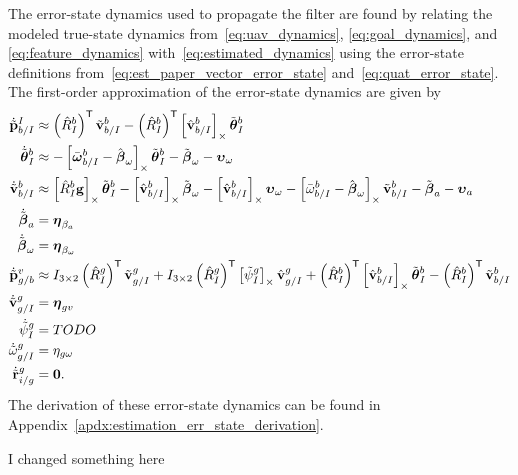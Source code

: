 The error-state dynamics used to propagate the filter are found by relating
the modeled true-state dynamics from~\eqref{eq:uav_dynamics},
\eqref{eq:goal_dynamics}, and \eqref{eq:feature_dynamics}
with~\eqref{eq:estimated_dynamics} using the error-state definitions
from~\eqref{eq:est_paper_vector_error_state} and~\eqref{eq:quat_error_state}. The
first-order approximation of the error-state dynamics are given by 
\begin{align}
  \dot{\tilde{\boldsymbol{\mathrm{p}}}}_{b/I}^I
  &\approx
  \left( \hat{R}_I^b \right)^{\mathsf{T}} \tilde{\boldsymbol{\mathrm{v}}}_{b/I}^b
  - \left( \hat{R}_I^b \right)^{\mathsf{T}} \left[ \hat{\boldsymbol{\mathrm{v}}}_{b/I}^b \right]_{\times}
  \tilde{\boldsymbol{\mathrm{\theta}}}_I^b
  \\
  \dot{\tilde{\boldsymbol{\mathrm{\theta}}}}_{I}^{b} 
  &\approx 	
  -\left[  \bar{\boldsymbol{\mathrm{\omega}}}_{b/I}^b - \hat{\boldsymbol{\mathrm{\beta}}}_\omega \right]_{\times}
    \tilde{\boldsymbol{\mathrm{\theta}}}_I^b
    - \tilde{\boldsymbol{\mathrm{\beta}}}_\omega -
    \boldsymbol{\mathrm{\upsilon}}_\omega
  \nonumber \\
  \dot{\tilde{\boldsymbol{\mathrm{v}}}}_{b/I}^b 
  &\approx
  \left[  \hat{R}_I^b \boldsymbol{\mathrm{g}}  \right]_{\times} \tilde{\boldsymbol{\mathrm{\theta}}}_I^b 
  -
  \left[  \hat{\boldsymbol{\mathrm{v}}}_{b/I}^b  \right]_{\times} \tilde{\boldsymbol{\mathrm{\beta}}}_\omega
  -
  \left[  \hat{\boldsymbol{\mathrm{v}}}_{b/I}^b  \right]_{\times} \boldsymbol{\mathrm{\upsilon}}_\omega
  -
  \left[  \bar{\omega}_{b/I}^b - \hat{\boldsymbol{\mathrm{\beta}}}_\omega  \right]_{\times}
  \tilde{\boldsymbol{\mathrm{v}}}_{b/I}^b
  -
  \tilde{\boldsymbol{\mathrm{\beta}}}_a
  -
  \boldsymbol{\mathrm{\upsilon}}_a \nonumber
  \\
  \dot{\tilde{\boldsymbol{\mathrm{\beta}}}}_a &= \boldsymbol{\mathrm{\eta}}_{\beta_a} \nonumber
  \\
  \dot{\tilde{\boldsymbol{\mathrm{\beta}}}}_\omega &= \boldsymbol{\mathrm{\eta}}_{\beta_\omega} \nonumber
  \\
  \dot{\tilde{\boldsymbol{\mathrm{p}}}}_{g/b}^{v}
                                  &\approx
  I_{3 \times 2} \left( \hat{R}_{I}^{g} \right)^{\mathsf{T}}
  \tilde{\boldsymbol{\mathrm{v}}}_{g/I}^g
  +
  I_{3 \times 2} \left( \hat{R}_{I}^{g} \right)^{\mathsf{T}}
  \left[  \tilde{\psi}_I^g  \right]_{\times} \hat{\boldsymbol{\mathrm{v}}}_{g/I}^g
  +
  \left( \hat{R}_{I}^{b} \right)^{\mathsf{T}} \left[  \hat{\boldsymbol{\mathrm{v}}}_{b/I}^{b}  \right]_{\times} 
  \tilde{\boldsymbol{\mathrm{\theta}}}_I^b
  -
  \left( \hat{R}_{I}^{b} \right)^{\mathsf{T}} \tilde{\boldsymbol{\mathrm{v}}}_{b/I}^{b} \nonumber \\
  \dot{\tilde{\boldsymbol{\mathrm{v}}}}_{g/I}^{g} &= \boldsymbol{\mathrm{\eta}}_{gv} \nonumber \\
  \dot{\tilde{\psi}}_{I}^{g} &= TODO \nonumber \\
  \dot{\tilde{\omega}}_{g/I}^{g} &= \eta_{g\omega} \nonumber \\
  \dot{\tilde{\boldsymbol{\mathrm{r}}}}_{i/g}^g &= \boldsymbol{\mathrm{0}}. \nonumber
\end{align}
The derivation of these error-state dynamics can be found in
Appendix~\ref{apdx:estimation_err_state_derivation}.

I changed something here

